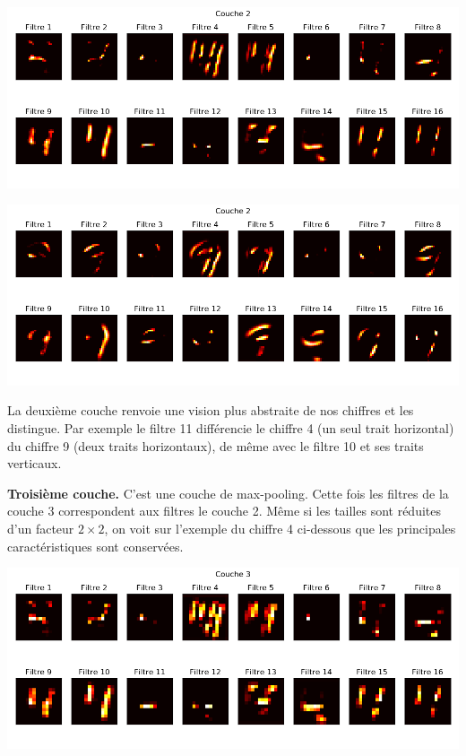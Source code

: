\documentclass[11pt,class=report,crop=false]{standalone}
\begin{document}
\begin{center}
\includegraphics[scale=\myscale,scale=0.65]{figures/tfconv-viz2-n56-4-c2}
\end{center}

\begin{center}
\includegraphics[scale=\myscale,scale=0.65]{figures/tfconv-viz2-n58-9-c2}
\end{center}

La deuxième couche renvoie une vision plus abstraite de nos chiffres et les distingue. Par exemple le filtre 11 différencie le chiffre 4 (un seul trait horizontal) du chiffre 9 (deux traits horizontaux), de même avec le filtre 10 et ses traits verticaux.

\bigskip
\textbf{Troisième couche.}
C'est une couche de max-pooling. Cette fois les filtres de la couche 3 correspondent aux filtres le couche 2. Même si les tailles sont réduites d'un facteur $2\times2$, on voit sur l'exemple du chiffre 4 ci-dessous que les principales caractéristiques sont conservées.

\begin{center}
\includegraphics[scale=\myscale,scale=0.65]{figures/tfconv-viz2-n56-4-c3}
\end{center}
\end{document}
